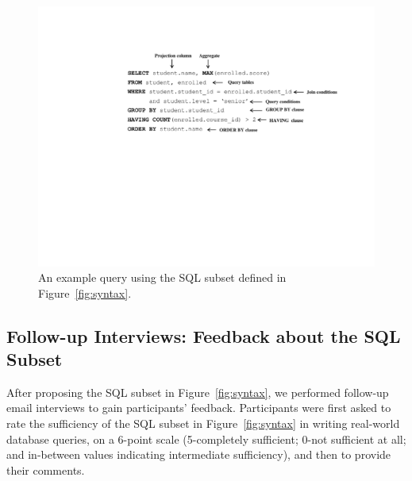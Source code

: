 



\begin{figure}[t]
  \centering
  \includegraphics[scale=0.52]{queryex}
  \vspace*{-5.3ex}\caption {{\label{fig:queryex}
  An example query using the SQL subset defined in Figure~\ref{fig:syntax}.
}}
\end{figure}

\vspace{-1mm}

\subsection{Follow-up Interviews: Feedback about the SQL Subset}
\label{sec:interview}

\vspace{-1mm}

After proposing the SQL subset in Figure~\ref{fig:syntax},
we performed follow-up email interviews to gain
participants' feedback. Participants were first asked to rate
the sufficiency of the SQL subset in Figure~\ref{fig:syntax}
in writing real-world database queries,
on a 6-point scale (5-completely
sufficient; 0-not sufficient at all;
and in-between values indicating intermediate sufficiency),
and then to provide their comments.

